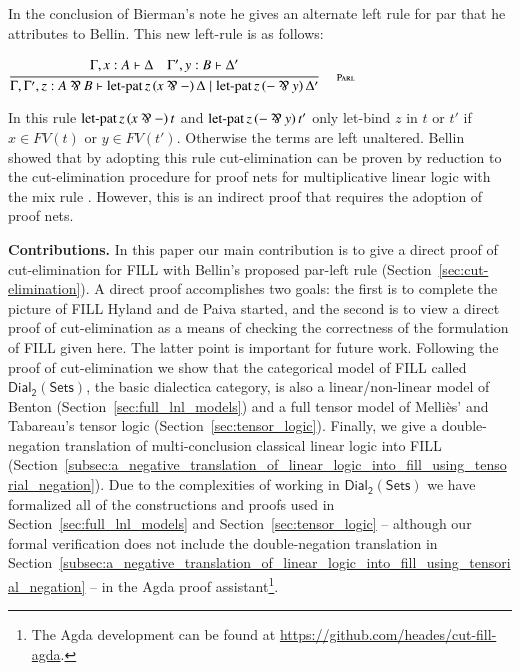 \documentclass{elsarticle}
\newcommand{\dial}[0]{\mathsf{Dial_2}(\mathsf{Sets})}
\begin{document}
In the conclusion of Bierman's note he gives an alternate left rule
for par that he attributes to Bellin.  This new left-rule is as
follows:
\begin{center}
  \begin{math}
    \FILLdruleParl{}
  \end{math}
\end{center}
In this rule $ \mathsf{\operatorname{let-pat} }\, \FILLmv{z} \, \FILLsym{(}   \FILLmv{x}  \parr   -    \FILLsym{)} \, \FILLnt{t} $ and $ \mathsf{\operatorname{let-pat} }\, \FILLmv{z} \, \FILLsym{(}    -   \parr  \FILLmv{y}   \FILLsym{)} \, \FILLnt{t'} $ only let-bind $z$ in $t$ or $t'$ if $x \in FV(t)$ or $y \in
FV(t')$.  Otherwise the terms are left unaltered.  Bellin showed that
by adopting this rule cut-elimination can be proven by reduction to
the cut-elimination procedure for proof nets for multiplicative linear
logic with the mix rule \cite{Bellin:1997}.  However, this is an
indirect proof that requires the adoption of proof nets.

\textbf{Contributions.} In this paper our main contribution is to give
a direct proof of cut-elimination for FILL with Bellin's proposed
par-left rule (Section~\ref{sec:cut-elimination}).  A direct proof
accomplishes two goals: the first is to complete the picture of FILL
Hyland and de Paiva started, and the second is to view a direct proof
of cut-elimination as a means of checking the correctness of the
formulation of FILL given here.  The latter point is important for
future work.  Following the proof of cut-elimination we show that the
categorical model of FILL called $\dial$, the basic dialectica
category, is also a linear/non-linear model of Benton
(Section~\ref{sec:full_lnl_models}) and a full tensor model of
Melli\`es' and Tabareau's tensor logic
(Section~\ref{sec:tensor_logic}). Finally, we give a double-negation
translation of multi-conclusion classical linear logic into FILL
(Section~\ref{subsec:a_negative_translation_of_linear_logic_into_fill_using_tensorial_negation}).
Due to the complexities of working in $\dial$ we have formalized all
of the constructions and proofs used in
Section~\ref{sec:full_lnl_models} and Section~\ref{sec:tensor_logic}
-- although our formal verification does not include the
double-negation translation in
Section~\ref{subsec:a_negative_translation_of_linear_logic_into_fill_using_tensorial_negation}
-- in the Agda proof assistant\footnote{The Agda development can be
  found at \url{https://github.com/heades/cut-fill-agda}.}.
\end{document}
